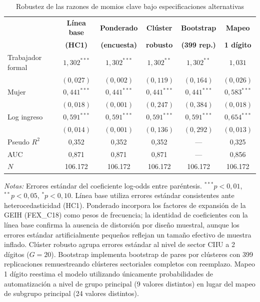 \documentclass{article}
\begin{document}
\begin{table}[htbp]
\centering
\caption{Robustez de las razones de momios clave bajo especificaciones alternativas}
\label{tab:robustness}
\begin{threeparttable}
\begin{tabular}{lccccc}
\toprule
& \textbf{L\'inea base} & \textbf{Ponderado} & \textbf{Cl\'uster} & \textbf{Bootstrap} & \textbf{Mapeo} \\
& \textbf{(HC1)} & \textbf{(encuesta)} & \textbf{robusto} & \textbf{(399 rep.)} & \textbf{1 d\'igito} \\
\midrule
Trabajador formal & $1{,}302^{***}$ & $1{,}302^{***}$ & $1{,}302^{**}$ & $1{,}302^{**}$ & $1{,}031$ \\
& $(0{,}027)$ & $(0{,}002)$ & $(0{,}119)$ & $(0{,}164)$ & $(0{,}026)$ \\[4pt]
Mujer & $0{,}441^{***}$ & $0{,}441^{***}$ & $0{,}441^{***}$ & $0{,}441^{***}$ & $0{,}583^{***}$ \\
& $(0{,}018)$ & $(0{,}001)$ & $(0{,}247)$ & $(0{,}384)$ & $(0{,}018)$ \\[4pt]
Log ingreso & $0{,}591^{***}$ & $0{,}591^{***}$ & $0{,}591^{***}$ & $0{,}591^{***}$ & $0{,}654^{***}$ \\
& $(0{,}014)$ & $(0{,}001)$ & $(0{,}136)$ & $(0{,}292)$ & $(0{,}013)$ \\[4pt]
\midrule
Pseudo $R^2$ & 0{,}352 & 0{,}352 & 0{,}352 & --- & 0{,}325 \\
AUC & 0{,}871 & 0{,}871 & 0{,}871 & --- & 0{,}856 \\
$N$ & 106.172 & 106.172 & 106.172 & 106.172 & 106.172 \\
\bottomrule
\end{tabular}
\begin{tablenotes}
\small
\item \textit{Notas:} Errores est\'andar del coeficiente log-odds entre par\'entesis. $^{***}p<0{,}01$, $^{**}p<0{,}05$, $^{*}p<0{,}10$. L\'inea base utiliza errores est\'andar consistentes ante heterocedasticidad (HC1). Ponderado incorpora los factores de expansi\'on de la GEIH (FEX\_C18) como pesos de frecuencia; la identidad de coeficientes con la l\'inea base confirma la ausencia de distorsi\'on por dise\~no muestral, aunque los errores est\'andar artificialmente peque\~nos reflejan un tama\~no efectivo de muestra inflado. Cl\'uster robusto agrupa errores est\'andar al nivel de sector CIIU a 2 d\'igitos ($G = 20$). Bootstrap implementa bootstrap de pares por cl\'usteres \cite{cameron2008bootstrap} con 399 replicaciones remuestreando cl\'usteres sectoriales completos con reemplazo. Mapeo 1 d\'igito reestima el modelo utilizando \'unicamente probabilidades de automatizaci\'on a nivel de grupo principal (9 valores distintos) en lugar del mapeo de subgrupo principal (24 valores distintos).
\end{tablenotes}
\end{threeparttable}
\end{table}
\end{document}
